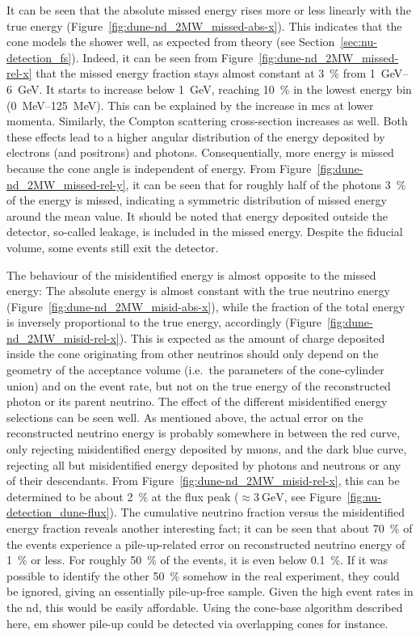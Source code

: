 It can be seen that the absolute missed energy rises more or less linearly with the true energy (Figure~\ref{fig:dune-nd_2MW_missed-abs-x}).
This indicates that the cone models the shower well, as expected from theory (see Section~\ref{sec:nu-detection_fs}).
Indeed, it can be seen from Figure~\ref{fig:dune-nd_2MW_missed-rel-x} that the missed energy fraction stays almost constant at \SI{3}{\percent} from \SIrange{1}{6}{\giga\electronvolt}.
It starts to increase below \SI{1}{\giga\electronvolt}, reaching \SI{10}{\percent} in the lowest energy bin (\SIrange{0}{125}{\mega\electronvolt}).
This can be explained by the increase in \gls{mcs} at lower momenta.
Similarly, the Compton scattering cross-section increases as well.
Both these effects lead to a higher angular distribution of the energy deposited by electrons (and positrons) and photons.
Consequentially, more energy is missed because the cone angle is independent of energy.
From Figure~\ref{fig:dune-nd_2MW_missed-rel-y}, it can be seen that for roughly half of the photons \SI{3}{\percent} of the energy is missed, indicating a symmetric distribution of missed energy around the mean value.
It should be noted that energy deposited outside the detector, so-called leakage, is included in the missed energy.
Despite the fiducial volume, some events still exit the detector.

The behaviour of the misidentified energy is almost opposite to the missed energy: The absolute energy is almost constant with the true neutrino energy (Figure~\ref{fig:dune-nd_2MW_misid-abs-x}), while the fraction of the total energy is inversely proportional to the true energy, accordingly (Figure~\ref{fig:dune-nd_2MW_misid-rel-x}).
This is expected as the amount of charge deposited inside the cone originating from other neutrinos should only depend on the geometry of the acceptance volume (i.e.\ the parameters of the cone-cylinder union) and on the event rate, but not on the true energy of the reconstructed photon or its parent neutrino.
The effect of the different misidentified energy selections can be seen well.
As mentioned above, the actual error on the reconstructed neutrino energy is probably somewhere in between the red curve, only rejecting misidentified energy deposited by muons, and the dark blue curve, rejecting all but misidentified energy deposited by photons and neutrons or any of their descendants.
From Figure~\ref{fig:dune-nd_2MW_misid-rel-x}, this can be determined to be about \SI{2}{\percent} at the flux peak ($\approx \SI{3}{\giga\electronvolt}$, see Figure~\ref{fig:nu-detection_dune-flux}).
The cumulative neutrino fraction versus the misidentified energy fraction reveals another interesting fact; it can be seen that about \SI{70}{\percent} of the events experience a pile-up-related error on reconstructed neutrino energy of \SI{1}{\percent} or less.
For roughly \SI{50}{\percent} of the events, it is even below \SI{0.1}{\percent}.
If it was possible to identify the other \SI{50}{\percent} somehow in the real experiment, they could be ignored, giving an essentially pile-up-free sample.
Given the high event rates in the \gls{nd}, this would be easily affordable.
Using the cone-base algorithm described here, \gls{em} shower pile-up could be detected via overlapping cones for instance.

